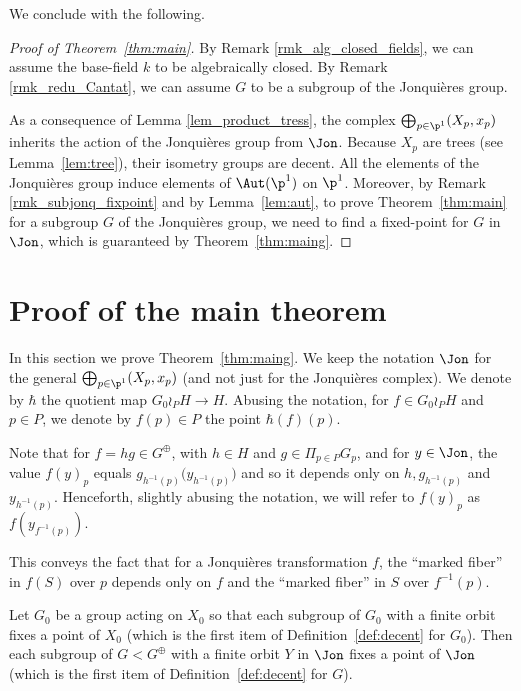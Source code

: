 {We conclude with the following.}

\begin{proof}[Proof of Theorem~\ref{thm:main}]
By Remark \ref{rmk_alg_closed_fields}, we can assume the {base-field $k$} to be algebraically closed. By Remark \ref{rmk_redu_Cantat}, we can assume $G$ to be a subgroup of the Jonquières group.

As a consequence of Lemma \ref{lem_product_tress}, the complex $\bigoplus_{p\in \p^1} (X_p,x_p)$ inherits the action of the Jonquières group from $\Jon$. Because $X_p$ are trees (see Lemma~\ref{lem:tree}), {their isometry groups are decent}. All the elements of the Jonquières group induce elements of $\Aut(\p^1)$ on $\p^1$.
Moreover, by Remark \ref{rmk_subjonq_fixpoint} and by Lemma~\ref{lem:aut}, to prove Theorem~\ref{thm:main} for a subgroup $G$ of the Jonquières group, we need to find a fixed-point for $G$ in $\Jon$, {which is guaranteed by} Theorem~\ref{thm:maing}.
\end{proof}

\section{Proof of the main theorem}
\label{sec:main}

In this section we prove Theorem~\ref{thm:maing}. We keep the notation $\Jon$ for the general $\bigoplus_{p\in \p^1} (X_p,x_p)$ (and not just for the Jonquières complex). We denote by $\hbar$ the quotient map $G_0\wr_P H\to H$. Abusing the notation, for $f\in G_0\wr_P H$ and $p\in P$, we denote by $f(p)\in P$ the point $\hbar(f)(p)$.

\begin{conv}
\label{conv:fibre}
Note that for $f=hg\in G^\oplus$, with $h\in H$ and $g\in\Pi_{p\in P} G_p$, and for $y\in \Jon$, the value $f(y)_p$ equals $g_{h^{-1}(p)}\big(y_{h^{-1}(p)}\big)$ and so it depends only on $h,g_{h^{-1}(p)}$ and $y_{h^{-1}(p)}$. Henceforth, slightly abusing the notation, we will refer to $f(y)_p$ as $f(y_{f^{-1}(p)})$.
\end{conv}

This conveys the fact that for a Jonquières transformation $f$, the ``marked fiber'' in $f(S)$ over $p$ depends only on $f$ and the ``marked fiber'' in $S$ over $f^{-1}(p)$.

{
\begin{lemma}
\label{lem:first_item}
Let $G_0$ be a group acting on $X_0$ so that each subgroup of $G_0$ with a finite orbit fixes a point of $X_0$ (which is the first item of Definition~\ref{def:decent} for $G_0$). Then each subgroup of $G<G^\oplus$ with a finite orbit $Y$ in $\Jon$ fixes a point of $\Jon$ (which is the first item of Definition~\ref{def:decent} for $G$).
\end{lemma}}

